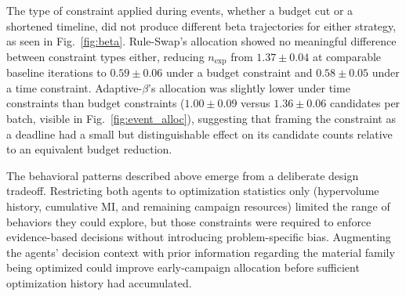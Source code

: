 The type of constraint applied during events, whether a budget cut or a shortened timeline, did not produce different beta trajectories for either strategy, as seen in Fig.~\ref{fig:beta}. Rule-Swap's allocation showed no meaningful difference between constraint types either, reducing $n_\mathrm{exp}$ from $1.37 \pm 0.04$ at comparable baseline iterations to $0.59 \pm 0.06$ under a budget constraint and $0.58 \pm 0.05$ under a time constraint. Adaptive-$\beta$'s allocation was slightly lower under time constraints than budget constraints ($1.00 \pm 0.09$ versus $1.36 \pm 0.06$ candidates per batch, visible in Fig.~\ref{fig:event_alloc}), suggesting that framing the constraint as a deadline had a small but distinguishable effect on its candidate counts relative to an equivalent budget reduction.

The behavioral patterns described above emerge from a deliberate design tradeoff. Restricting both agents to optimization statistics only (hypervolume history, cumulative MI, and remaining campaign resources) limited the range of behaviors they could explore, but those constraints were required to enforce evidence-based decisions without introducing problem-specific bias. Augmenting the agents' decision context with prior information regarding the material family being optimized could improve early-campaign allocation before sufficient optimization history had accumulated.
